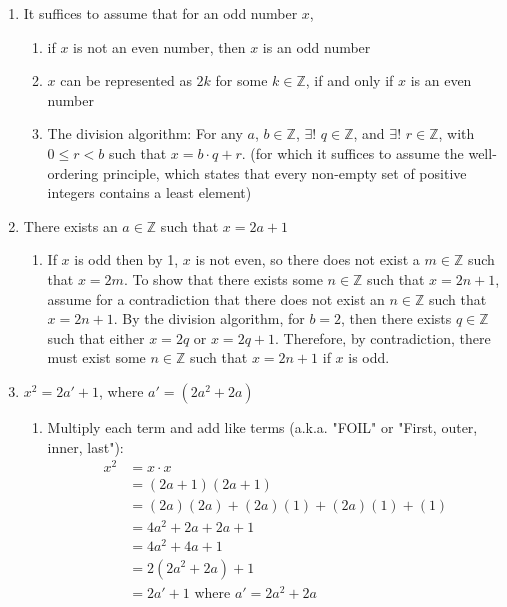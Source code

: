 \documentclass[letterpaper,twoside,10pt]{article}
\newcommand{\Z}{\mathbb{Z}}
\begin{document}
\begin{enumerate} 
	\item It suffices to assume that for an odd number $x$, 
	\begin{enumerate}
		\item if $x$ is not an even number, then $x$ is an odd number 
		\item $x$ can be represented as $2k$ for some $k \in \mathbb{Z}$, if and only if $x$ is an even number
		\item The division algorithm: For any $a$, $b\in\mathbb{Z}$, $\exists !$ $q \in \mathbb{Z}$, and $\exists !$ $r \in \mathbb{Z}$, with $0\leq r < b$ such that $x = b\cdot q + r$. (for which it suffices to assume the well-ordering principle, which states that every non-empty set of positive integers contains a least element)
	\end{enumerate}
	\item There exists an $a \in \mathbb{Z}$ such that $x = 2a+1$
		\begin{enumerate}
			\item If $x$ is odd then by 1, $x$ is not even, so there does not exist a $m \in\Z$ such that $x=2m$. To show that there exists some $n \in\Z$ such that $x=2n+1$, assume for a contradiction that there does not exist an $n\in\Z$ such that $x=2n+1$. By the division algorithm, for $b=2$, then there exists $q\in\Z$ such that either $x=2q$ or $x=2q+1$. Therefore, by contradiction, there must exist some $n\in\Z$ such that $x=2n+1$ if $x$ is odd. 
		\end{enumerate}
	\item $x^2 = 2a' + 1$, where $a' = (2a^2 + 2a)$
		\begin{enumerate}
			\item Multiply each term and add like terms (a.k.a. "FOIL" or "First, outer, inner, last"): 
				\begin{align*}
					x^2 &= x \cdot x \\
					&= (2a+1)(2a+1)\\
					&= (2a)(2a) + (2a)(1) + (2a)(1) + (1) \\
					&= 4a^2 + 2a + 2a + 1 \\
					&= 4a^2 + 4a + 1 \\
					&= 2(2a^2 + 2a) + 1 \\
					&= 2a' + 1 \text{ where } a' = 2a^2 + 2a

\end{align*}
\end{enumerate}
\end{enumerate}
\end{document}
